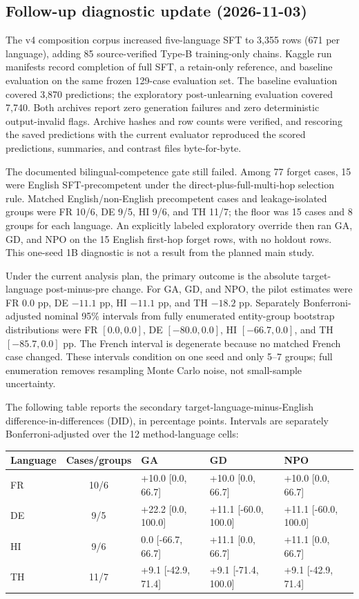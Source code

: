 \documentclass[10pt,a4paper]{article}
\begin{document}
\subsection*{Follow-up diagnostic update (2026-11-03)}

The v4 composition corpus increased five-language SFT to 3,355 rows (671 per language), adding 85 source-verified Type-B training-only chains. Kaggle run manifests record completion of full SFT, a retain-only reference, and baseline evaluation on the same frozen 129-case evaluation set. The baseline evaluation covered 3,870 predictions; the exploratory post-unlearning evaluation covered 7,740. Both archives report zero generation failures and zero deterministic output-invalid flags. Archive hashes and row counts were verified, and rescoring the saved predictions with the current evaluator reproduced the scored predictions, summaries, and contrast files byte-for-byte.

The documented bilingual-competence gate still failed. Among 77 forget cases, 15 were English SFT-precompetent under the direct-plus-full-multi-hop selection rule. Matched English/non-English precompetent cases and leakage-isolated groups were FR 10/6, DE 9/5, HI 9/6, and TH 11/7; the floor was 15 cases and 8 groups for each language. An explicitly labeled exploratory override then ran GA, GD, and NPO on the 15 English first-hop forget rows, with no holdout rows. This one-seed 1B diagnostic is not a result from the planned main study.

Under the current analysis plan, the primary outcome is the absolute target-language post-minus-pre change. For GA, GD, and NPO, the pilot estimates were FR $0.0$ pp, DE $-11.1$ pp, HI $-11.1$ pp, and TH $-18.2$ pp. Separately Bonferroni-adjusted nominal 95\% intervals from fully enumerated entity-group bootstrap distributions were FR $[0.0,0.0]$, DE $[-80.0,0.0]$, HI $[-66.7,0.0]$, and TH $[-85.7,0.0]$ pp. The French interval is degenerate because no matched French case changed. These intervals condition on one seed and only 5--7 groups; full enumeration removes resampling Monte Carlo noise, not small-sample uncertainty.

The following table reports the secondary target-language-minus-English difference-in-differences (DID), in percentage points. Intervals are separately Bonferroni-adjusted over the 12 method-language cells:

\begin{center}
\small
\begin{tabularx}{\textwidth}{@{}l c X X X@{}}
\toprule
Language & Cases/groups & GA & GD & NPO \\
\midrule
FR & 10/6 & +10.0 [0.0, 66.7] & +10.0 [0.0, 66.7] & +10.0 [0.0, 66.7] \\
DE & 9/5 & +22.2 [0.0, 100.0] & +11.1 [-60.0, 100.0] & +11.1 [-60.0, 100.0] \\
HI & 9/6 & 0.0 [-66.7, 66.7] & +11.1 [0.0, 66.7] & +11.1 [0.0, 66.7] \\
TH & 11/7 & +9.1 [-42.9, 71.4] & +9.1 [-71.4, 100.0] & +9.1 [-42.9, 71.4] \\
\bottomrule
\end{tabularx}
\end{center}
\end{document}
